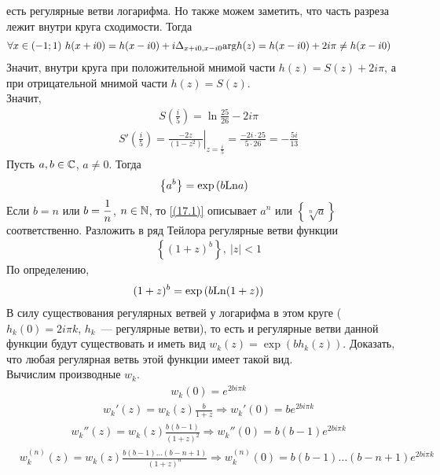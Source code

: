есть регулярные ветви логарифма. Но также можем заметить, что часть разреза
лежит внутри круга сходимости. Тогда
\begin{align*}
  & \forall x \in (-1;1) \ h(x + i0) = h(x-i0) + i\Delta_{x+i0, x-i0}\mathrm{arg} h(z) = h(x-i0) + 2 i \pi \neq h(x-i0)
\end{align*}
Значит, внутри круга при положительной мнимой части $h(z) = S(z) + 2 i \pi$, а
при отрицательной мнимой части $h(z) = S(z)$.
\\
Значит,
\begin{align*}
  & S\left( \frac{i}{5} \right) = \ln \frac{25}{26} - 2 i \pi
\end{align*}
\begin{align*}
  & S'\left( \frac{i}{5} \right) = \left. \frac{-2z}{(1-z^2)} \right|_{z=\frac{i}{5}} = \frac{-2i\cdot 25}{5\cdot 26} = -\frac{5i}{13}
\end{align*}
\Def
Пусть $a, b \in \mathbb{C}$, $a \neq 0$. Тогда
\begin{equation}\label{(17.1)}
    \left\{ a^b \right\} = \exp\left( b \mathrm{Ln} a\right)
\end{equation}
\Exse
Если $b = n$ или $b = \displaystyle \frac{1}{n}$, $n\in \mathbb{N}$, то \eqref{(17.1)} описывает
$a^n$ или $\left\{ \sqrt[n]{a} \right\}$ соответственно.
\Example
Разложить в ряд Тейлора регулярные ветви функции
\begin{align*}
  & \left\{ (1+z)^b \right\}, \ \left| z \right|<1
\end{align*}
\nonum
По определению,
\begin{align*}
  & (1+z)^b = \exp \left( b \mathrm{Ln} (1+z) \right)
\end{align*}
В силу существования регулярных ветвей у логарифма в этом круге ($h_k(0) = 2 i
\pi k$, $h_k$~--- регулярные ветви), то есть и регулярные ветви данной функции
будут существовать и иметь вид $w_k(z) = \exp \left( b h_k(z) \right)$.
\Exse
Доказать, что любая регулярная ветвь этой функции имеет такой вид.
\\
Вычислим производные $w_k$.
\begin{align*}
  & w_k(0) = e^{2bi\pi k}
\end{align*}
\begin{align*}
  & w_k'(z) = w_k(z) \frac{b}{1+z} \Rightarrow w_k'(0) = be^{2bi\pi k}
\end{align*}
\begin{align*}
  & w_k''(z) = w_k(z) \frac{b(b-1)}{(1+z)^2} \Rightarrow w_k''(0) = b(b-1)e^{2bi\pi k}
\end{align*}
\begin{align*}
  & w_k^{(n)}(z) = w_k(z) \frac{b(b-1)\dots(b-n+1)}{(1+z)^n} \Rightarrow w_k^{(n)}(0) = b(b-1)\dots(b-n+1)e^{2bi\pi k}
\end{align*}
